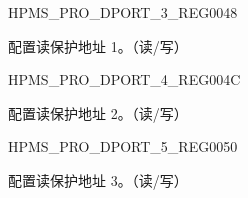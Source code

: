 \begin{register}{H}{PMS\_PRO\_DPORT\_3\_REG}{\hexprefix{}0048}\label{regdesc:PMSPRODPORT3REG}
%
%
\regnewline%
\begin{regdesc}\begin{reglist}
\label{fielddesc:PMSPRODPORTRESERVEFIFO1}\item [PMS\_PRO\_DPORT\_RESERVE\_FIFO\_1] 配置读保护地址 1。（读/写）
\end{reglist}\end{regdesc}
\end{register}


\begin{register}{H}{PMS\_PRO\_DPORT\_4\_REG}{\hexprefix{}004C}\label{regdesc:PMSPRODPORT4REG}
%
%
\regnewline%
\begin{regdesc}\begin{reglist}
\label{fielddesc:PMSPRODPORTRESERVEFIFO2}\item [PMS\_PRO\_DPORT\_RESERVE\_FIFO\_2] 配置读保护地址 2。（读/写）
\end{reglist}\end{regdesc}
\end{register}


\begin{register}{H}{PMS\_PRO\_DPORT\_5\_REG}{\hexprefix{}0050}\label{regdesc:PMSPRODPORT5REG}
%
%
\regnewline%
\begin{regdesc}\begin{reglist}
\label{fielddesc:PMSPRODPORTRESERVEFIFO3}\item [PMS\_PRO\_DPORT\_RESERVE\_FIFO\_3] 配置读保护地址 3。（读/写）
\end{reglist}\end{regdesc}
\end{register}



